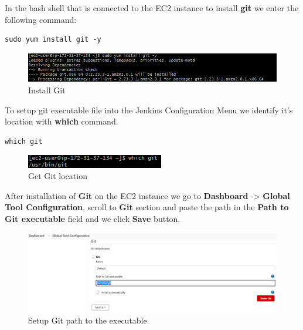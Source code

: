 \documentclass[12pt,a4paper,twoside]{article}
\begin{document}
In the bash shell that is connected to the EC2 instance to install \textbf{git} we enter the following command:


\begin{verbatim}
sudo yum install git -y
\end{verbatim}


\begin{figure}[H]
    \centering
        \includegraphics[width=15cm]{images-aws/27-jenkins-install-git.png}
        \caption{Install Git}
\end{figure}


To setup git executable file into the Jenkins Configuration Menu we identify it's location with \textbf{which} command.


\begin{verbatim}
which git
\end{verbatim}


\begin{figure}[H]
    \centering
        \includegraphics[width=6cm]{images-aws/28-jenkins-git-on-local.png}
        \caption{Get Git location}
\end{figure}


After installation of \textbf{Git} on the EC2 instance we go to \textbf{Dashboard} -> \textbf{Global Tool Configuration}, scroll to \textbf{Git} section and paste the path in the \textbf{Path to Git executable} field and we click \textbf{Save} button.


\begin{figure}[H]
    \centering
        \includegraphics[width=15cm]{images-aws/29-jenkins-git-set-path.png}
        \caption{Setup Git path to the executable}
\end{figure}
\end{document}
